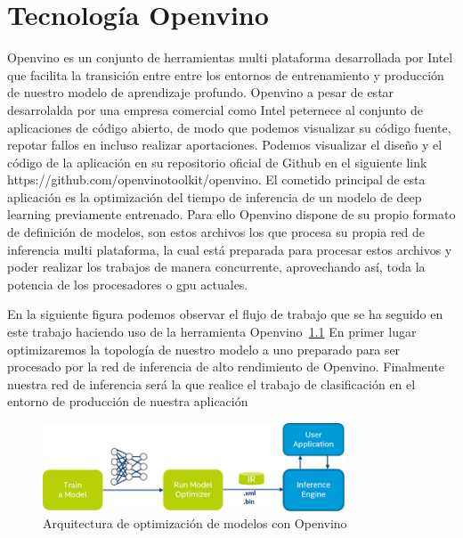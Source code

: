 \cleardoublepage
\mbox{}


\chapter{Tecnología Openvino}
\label{ch:chapter3}
Openvino es un conjunto de herramientas multi plataforma desarrollada por Intel que facilita la transición entre entre los entornos de entrenamiento y producción de nuestro modelo de aprendizaje profundo.
Openvino a pesar de estar desarrolalda por una empresa comercial como Intel peternece al conjunto de aplicaciones de código abierto, de modo que podemos visualizar su código fuente, repotar fallos en incluso realizar aportaciones.
Podemos visualizar el diseño y el código de la aplicación en su repositorio oficial de Github en el siguiente link https://github.com/openvinotoolkit/openvino.
El cometido principal de esta aplicación es la optimización del tiempo de inferencia de un modelo de deep learning previamente entrenado.
Para ello Openvino dispone de su propio formato de definición de modelos, son estos archivos los que procesa su propia red de inferencia multi plataforma, la cual está preparada para procesar estos archivos y poder
realizar los trabajos de manera concurrente, aprovechando así, toda la potencia de los procesadores o gpu actuales.


En la siguiente figura podemos observar el flujo de trabajo que se ha seguido en este trabajo haciendo uso de la herramienta Openvino~\ref{fig:Arquitectura de optimización de modelos con Openvino}
En primer lugar optimizaremos la topología de nuestro modelo a uno preparado para ser procesado por la red de inferencia de alto rendimiento de Openvino.
Finalmente nuestra red de inferencia será la que realice el trabajo de clasificación en el entorno de producción de nuestra aplicación

\begin{figure}
    \centering
    \includegraphics[width=0.8\textwidth]{images/chapter3/openvino_workflow.png}
    \caption{Arquitectura de optimización de modelos con Openvino}
    \label{fig:Arquitectura de optimización de modelos con Openvino}
\end{figure}


